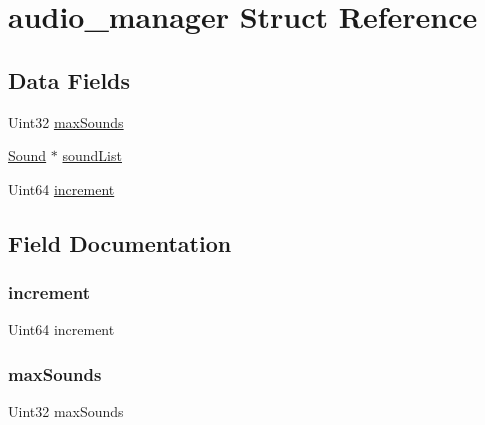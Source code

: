 \hypertarget{structaudio__manager}{}\section{audio\+\_\+manager Struct Reference}
\label{structaudio__manager}
\subsection*{Data Fields}
\begin{DoxyCompactItemize}
\item 
Uint32 \hyperlink{structaudio__manager_ab75ce519cd6dd16c6d1307703b09a7cd}{max\+Sounds}
\item 
\hyperlink{audio_8h_aa9272c2e4e238417673f542719f44a32}{Sound} $\ast$ \hyperlink{structaudio__manager_aadd5a1903ca098aeb0e6677a2b1a68db}{sound\+List}
\item 
Uint64 \hyperlink{structaudio__manager_ab08657e2d8ce2eb598d448722ef0959b}{increment}
\end{DoxyCompactItemize}


\subsection{Field Documentation}
\mbox{\label{structaudio__manager_ab08657e2d8ce2eb598d448722ef0959b}} 
\subsubsection{\texorpdfstring{increment}{increment}}
{\footnotesize\ttfamily Uint64 increment}

\mbox{\label{structaudio__manager_ab75ce519cd6dd16c6d1307703b09a7cd}} 
\subsubsection{\texorpdfstring{max\+Sounds}{maxSounds}}
{\footnotesize\ttfamily Uint32 max\+Sounds}

\mbox{\label{structaudio__manager_aadd5a1903ca098aeb0e6677a2b1a68db}} 
